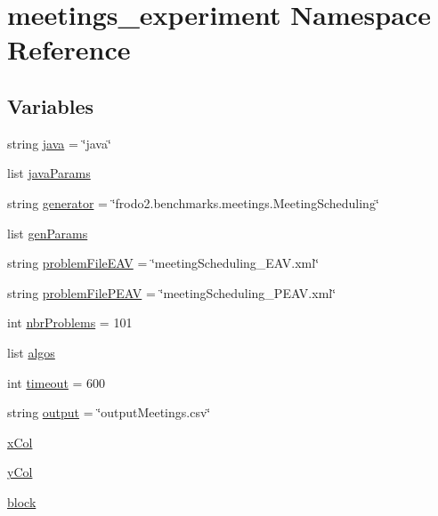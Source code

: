 \hypertarget{namespacemeetings__experiment}{}\section{meetings\+\_\+experiment Namespace Reference}
\label{namespacemeetings__experiment}
\subsection*{Variables}
\begin{DoxyCompactItemize}
\item 
string \hyperlink{namespacemeetings__experiment_a8470b61efa2bb39406b0b1f11c223db8}{java} = \char`\"{}java\char`\"{}
\item 
list \hyperlink{namespacemeetings__experiment_a77e443fc7411b80fcd69dba9f6895216}{java\+Params}
\item 
string \hyperlink{namespacemeetings__experiment_a10f7f382d5248b7222e93235dbcb736b}{generator} = \char`\"{}frodo2.\+benchmarks.\+meetings.\+Meeting\+Scheduling\char`\"{}
\item 
list \hyperlink{namespacemeetings__experiment_add19e7c8e5aa8019584c230f3033b7e4}{gen\+Params}
\item 
string \hyperlink{namespacemeetings__experiment_a518e52133749fed6eba982832fadd6ed}{problem\+File\+E\+AV} = \char`\"{}meeting\+Scheduling\+\_\+\+E\+A\+V.\+xml\char`\"{}
\item 
string \hyperlink{namespacemeetings__experiment_a7a9dd9afb1e8a201ea8396b69aa979b0}{problem\+File\+P\+E\+AV} = \char`\"{}meeting\+Scheduling\+\_\+\+P\+E\+A\+V.\+xml\char`\"{}
\item 
int \hyperlink{namespacemeetings__experiment_aa9963d5b365b9cb5d32d58f1e64237aa}{nbr\+Problems} = 101
\item 
list \hyperlink{namespacemeetings__experiment_a074f5746ecf90968184c1678fb7dd144}{algos}
\item 
int \hyperlink{namespacemeetings__experiment_a76960f353ee09617f2d8040c5b1c487c}{timeout} = 600
\item 
string \hyperlink{namespacemeetings__experiment_aadbd7f54566eb18eb0ddf6f688ad5617}{output} = \char`\"{}output\+Meetings.\+csv\char`\"{}
\item 
\hyperlink{namespacemeetings__experiment_a87d1ca9fb344948672ec5f36d37325c6}{x\+Col}
\item 
\hyperlink{namespacemeetings__experiment_a2729bb00739523849d8133643b22d1ec}{y\+Col}
\item 
\hyperlink{namespacemeetings__experiment_a10f77404dac7de8583d987fbe5bec42c}{block}
\end{DoxyCompactItemize}


